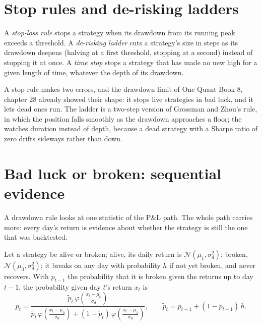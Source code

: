 \section{Stop rules and de-risking ladders}

\begin{definition}\label{def:fm:managing-a-book-through-drawdown:rules}
A \emph{stop-loss rule} stops a strategy when its drawdown from its running peak exceeds a threshold. A \emph{de-risking
ladder} cuts a strategy's size in steps as its drawdown deepens (halving at a first threshold, stopping at a second)
instead of stopping it at once. A \emph{time stop} stops a strategy that has made no new high for a given length of time,
whatever the depth of its drawdown.
\end{definition}

A stop rule makes two errors, and the drawdown limit of One Quant Book 8, chapter 28 already showed their shape: it stops live strategies in bad
luck, and it lets dead ones run. The ladder is a two-step version of Grossman and Zhou's rule, in which the position falls smoothly as the
drawdown approaches a floor; the  watches duration instead of depth, because a dead strategy with a Sharpe ratio of zero drifts
sideways rather than down.

\label{lst:fm:managing-a-book-through-drawdown:posterior}

\section{Bad luck or broken: sequential evidence}

A drawdown rule looks at one statistic of the P\&L path. The whole path carries more: every day's return is evidence about whether the strategy
is still the one that was backtested.

\begin{proposition}\label{prop:fm:managing-a-book-through-drawdown:posterior}
Let a strategy be alive or broken; alive, its daily return is $\mathcal N(\mu_1,\sigma_d^2)$; broken, $\mathcal N(\mu_0,\sigma_d^2)$; it breaks on
any day with probability $h$ if not yet broken, and never recovers. With $p_{t-1}$ the probability that it is broken given the returns up to day
$t-1$, the probability given day $t$'s return $x_t$ is
\[
p_t=\frac{\tilde p_t\,\varphi\!\left(\frac{x_t-\mu_0}{\sigma_d}\right)}{\tilde p_t\,\varphi\!\left(\frac{x_t-\mu_0}{\sigma_d}\right)+(1-\tilde p_t)\,\varphi\!\left(\frac{x_t-\mu_1}{\sigma_d}\right)},
\qquad \tilde p_t=p_{t-1}+(1-p_{t-1})\,h .
\]
\end{proposition}

